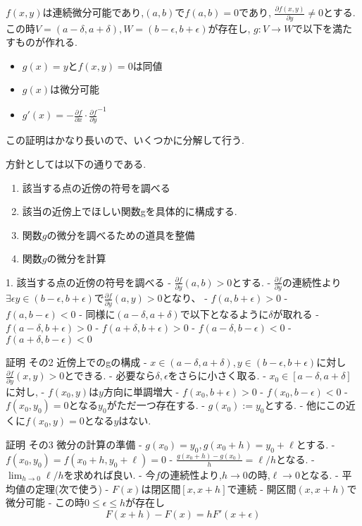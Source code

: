 \documentclass{ujarticle}
\begin{document}
\begin{thm}
$f(x ,y)$は連続微分可能であり,$(a, b)$で$f(a , b) = 0$であり,
$\frac{\partial f(x, y)}{\partial y} \neq 0$とする.
この時$V = (a - \delta, a + \delta),W = (b - \epsilon , b + \epsilon)$が存在し,
$g:V \to W$で以下を満たすものが作れる.
\begin{itemize}
  \item $g(x) = y$と$f(x, y) = 0$は同値
  \item $g(x)$は微分可能
  \item $g'(x) = - \frac{\partial f}{\partial x} \cdot \frac{\partial f}{\partial y}^{-1}$
\end{itemize}
\end{thm}
この証明はかなり長いので、いくつかに分解して行う.

方針としては以下の通りである.

\begin{enumerate}
    \item 該当する点の近傍の符号を調べる
    \item 該当の近傍上でほしい関数gを具体的に構成する.
    \item 関数$g$の微分を調べるための道具を整備
    \item 関数$g$の微分を計算
\end{enumerate}

1. 該当する点の近傍の符号を調べる
- $\frac{\partial f}{\partial y}(a, b) > 0$とする.
- $\frac{\partial f}{\partial y}$の連続性より$\exists  \epsilon y \in (b - \epsilon, b + \epsilon)$で$\frac{\partial f}{\partial y}(a, y) > 0$となり、
  - $f(a, b + \epsilon) > 0$
  - $f(a, b - \epsilon) < 0$
- 同様に$(a - \delta, a + \delta)$で以下となるように$\delta$が取れる
  - $f(a - \delta, b + \epsilon) > 0$
  - $f(a + \delta, b + \epsilon) > 0$
  - $f(a - \delta, b - \epsilon) < 0$
  - $f(a + \delta, b - \epsilon) < 0$

証明 その2 近傍上でのgの構成
- $x \in (a - \delta, a + \delta), y \in (b - \epsilon, b + \epsilon)$に対し$\frac{\partial f}{\partial y}(x, y) > 0$とできる.
  - 必要なら$\delta, \epsilon$をさらに小さく取る.
- $x_0 \in [a - \delta, a + \delta]$に対し,
  - $f(x_0, y)$は$y$方向に単調増大
  - $f(x_0, b + \epsilon) > 0$
  - $f(x_0, b - \epsilon) < 0$
- $f(x_0, y_0) = 0$となる$y_0$がただ一つ存在する.
- $g(x_0):= y_0$とする.
- 他にこの近くに$f(x_0, y) = 0$となる$y$はない.


証明 その3 微分の計算の準備
- $g(x_0) = y_0, g(x_0 + h) = y_0 + \ell$とする.
  - $f(x_0, y_0) = f(x_0 + h, y_0 + \ell) = 0$
- $\frac{g(x_0 + h) - g(x_0)}{h} = \ell / h$となる.
- $\lim_{h \to 0} \ell / h$を求めれば良い.
- 今$f$の連続性より,$h \to 0$の時,$\ell \to 0$となる.
- 平均値の定理(次で使う)
  - $F(x)$は閉区間$[x, x+h]$で連続
  - 開区間$(x, x + h)$で微分可能
  - この時$0 \le \epsilon \le h$が存在し
  $$F(x+h) - F(x) = hF'(x+ \epsilon)$$
\end{document}
